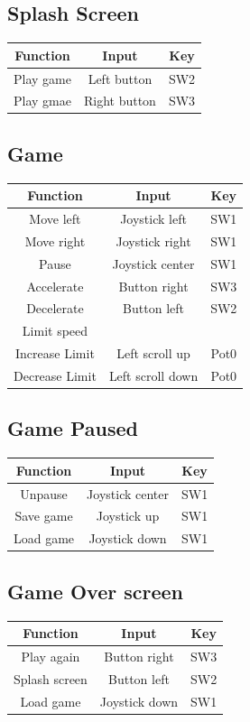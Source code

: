 \documentclass{article}
\begin{document}
\subsection*{Splash Screen}
\begin{center}
\begin{tabular}{ c c c }
 Function 	& Input 		& Key \\ \hline
 Play game 	& Left button 	& SW2 \\  
 Play gmae 	& Right button 	& SW3    
\end{tabular}
\end{center}

\subsection*{Game}
\begin{center}
\begin{tabular}{ c c c }
 Function 	& Input 		& Key \\ \hline
 Move left	& Joystick left	& SW1	\\
 Move right	& Joystick right	& SW1	\\
 Pause	& Joystick center 	& SW1	\\
 Accelerate	& Button right	& SW3	\\ 
 Decelerate	& Button left		& SW2	\\
 Limit speed	&			&		\\
 Increase Limit & Left scroll up 	& Pot0	\\
 Decrease Limit & Left scroll down & Pot0
\end{tabular}
\end{center}

\subsection*{Game Paused}
\begin{center}
\begin{tabular}{ c c c }
Function 	& Input 		& Key \\ \hline
Unpause	& Joystick center 	& SW1	\\
Save game	& Joystick up 	& SW1	\\
Load game 	& Joystick down	& SW1	\\
\end{tabular}
\end{center}

\subsection*{Game Over screen}
\begin{center}
\begin{tabular}{ c c c }
Function 	& Input 		& Key \\ \hline
Play again	& Button right	& SW3	\\
Splash screen& Button left 	& SW2 	\\
Load game 	& Joystick down 	& SW1	\\
\end{tabular}
\end{center}
\end{document}
